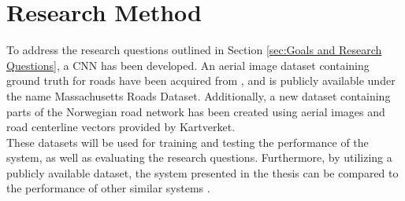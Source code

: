 \section{Research Method}
\label{sec:researchMethod}
To address the research questions outlined in Section \ref{sec:Goals and Research Questions}, a \ac{CNN} has been developed. An aerial image dataset containing ground truth for roads have been acquired from \citep{MnihThesis}, and is publicly available under the name Massachusetts Roads Dataset. Additionally, a new dataset containing parts of the Norwegian road network has been created using aerial images and road centerline vectors provided by Kartverket.\\   

These datasets will be used for training and testing the performance of the system, as well as evaluating the research questions. Furthermore, by utilizing a publicly available dataset, the system presented in the thesis can be compared to the performance of other similar systems \citep{MnihThesis}\citep{saito_building_and_roads}.  